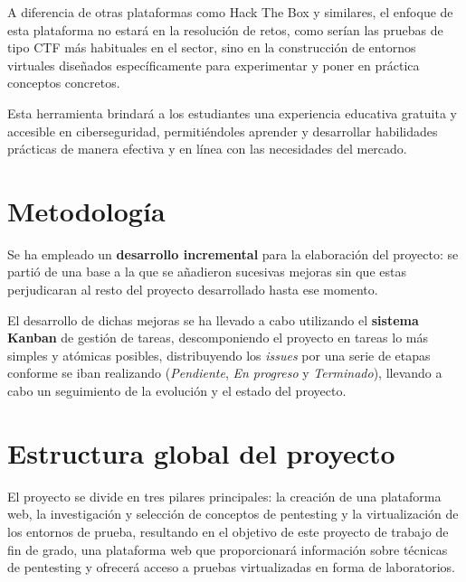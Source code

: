         A diferencia de otras plataformas como Hack The Box y similares, el enfoque de esta plataforma no estará en la resolución de retos, como serían las pruebas de tipo CTF más habituales en el sector, sino en la construcción de entornos virtuales diseñados específicamente para experimentar y poner en práctica conceptos concretos.
        
        Esta herramienta brindará a los estudiantes una experiencia educativa gratuita y accesible en ciberseguridad, permitiéndoles aprender y desarrollar habilidades prácticas de manera efectiva y en línea con las necesidades del mercado.
    
    
    \section{Metodología}
    
        Se ha empleado un \textbf{desarrollo incremental} para la elaboración del proyecto: se partió de una base a la que se añadieron sucesivas mejoras sin que estas perjudicaran al resto del proyecto desarrollado hasta ese momento.
        
        El desarrollo de dichas mejoras se ha llevado a cabo utilizando el \textbf{sistema Kanban} de gestión de tareas, descomponiendo el proyecto en tareas lo más simples y atómicas posibles, distribuyendo los \textit{issues} por una serie de etapas conforme se iban realizando (\textit{Pendiente}, \textit{En progreso} y \textit{Terminado}), llevando a cabo un seguimiento de la evolución y el estado del proyecto.
        
        
        
        \newpage
    
    \section{Estructura global del proyecto}
        \label{sec:estructura-global}
        
        El proyecto se divide en tres pilares principales: la creación de una plataforma web, la investigación y selección de conceptos de pentesting y la virtualización de los entornos de prueba, resultando en el objetivo de este proyecto de trabajo de fin de grado, una plataforma web que proporcionará información sobre técnicas de pentesting y ofrecerá acceso a pruebas virtualizadas en forma de laboratorios. 
        
